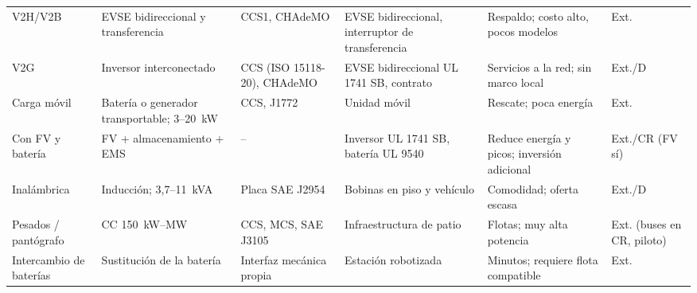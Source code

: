 {\begin{longtable}{L{2.25cm}L{2.5cm}L{2.0cm}L{2.5cm}L{2.7cm}L{2.6cm}}
V2H/V2B & EVSE bidireccional y transferencia & CCS1, CHAdeMO & EVSE bidireccional, interruptor de transferencia & Respaldo; costo alto, pocos modelos & Ext.\\
V2G & Inversor interconectado & CCS (ISO 15118-20), CHAdeMO & EVSE bidireccional UL 1741 SB, contrato & Servicios a la red; sin marco local & Ext./D\\
Carga móvil & Batería o generador transportable; 3--20~kW & CCS, J1772 & Unidad móvil & Rescate; poca energía & Ext.\\
Con FV y batería & FV + almacenamiento + EMS & -- & Inversor UL 1741 SB, batería UL 9540 & Reduce energía y picos; inversión adicional & Ext./CR (FV sí)\\
Inalámbrica & Inducción; 3,7--11~kVA & Placa SAE J2954 & Bobinas en piso y vehículo & Comodidad; oferta escasa & Ext./D\\
Pesados / pantógrafo & CC 150~kW--MW & CCS, MCS, SAE J3105 & Infraestructura de patio & Flotas; muy alta potencia & Ext. (buses en CR, piloto)\\
Intercambio de baterías & Sustitución de la batería & Interfaz mecánica propia & Estación robotizada & Minutos; requiere flota compatible & Ext.\\
\bottomrule
\end{longtable}}
